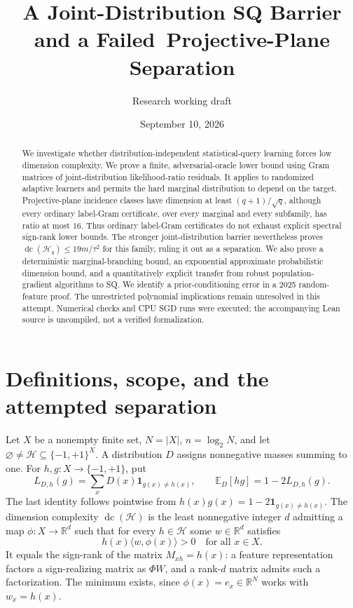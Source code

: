 \documentclass[11pt]{article}
\title{A Joint-Distribution SQ Barrier and a Failed\ Projective-Plane Separation}
\author{Research working draft}
\date{September 10, 2026}
\DeclareMathOperator{\dc}{dc}
\newcommand{\R}{\mathbb R}
\newcommand{\E}{\mathbb E}
\newcommand{\1}{\mathbf 1}
\newcommand{\cH}{\mathcal H}
\begin{document}
\maketitle
\begin{abstract}
We investigate whether distribution-independent statistical-query learning forces low dimension complexity. We prove a finite, adversarial-oracle lower bound using Gram matrices of joint-distribution likelihood-ratio residuals. It applies to randomized adaptive learners and permits the hard marginal distribution to depend on the target. Projective-plane incidence classes have dimension at least $(q+1)/\sqrt q$, although every ordinary label-Gram certificate, over every marginal and every subfamily, has ratio at most $16$. Thus ordinary label-Gram certificates do not exhaust explicit spectral sign-rank lower bounds. The stronger joint-distribution barrier nevertheless proves $\dc(\cH_q)\leq 19m/\tau^2$ for this family, ruling it out as a separation. We also prove a deterministic marginal-branching bound, an exponential approximate probabilistic dimension bound, and a quantitatively explicit transfer from robust population-gradient algorithms to SQ. We identify a prior-conditioning error in a 2025 random-feature proof. The unrestricted polynomial implications remain unresolved in this attempt. Numerical checks and CPU SGD runs were executed; the accompanying Lean source is uncompiled, not a verified formalization.
\end{abstract}

\section{Definitions, scope, and the attempted separation}
Let $X$ be a nonempty finite set, $N=|X|$, $n=\log_2N$, and let $\varnothing\ne\cH\subseteq\{-1,+1\}^X$. A distribution $D$ assigns nonnegative masses summing to one. For $h,g:X\to\{-1,+1\}$, put
\[
 L_{D,h}(g)=\sum_xD(x)\1_{g(x)\ne h(x)},\qquad
 \E_D[hg]=1-2L_{D,h}(g).
\]
The last identity follows pointwise from $h(x)g(x)=1-2\1_{g(x)\ne h(x)}$.
The dimension complexity $\dc(\cH)$ is the least nonnegative integer $d$ admitting a map $\phi:X\to\R^d$ such that for every $h\in\cH$ some $w\in\R^d$ satisfies
\begin{equation}\label{eq:strict}
 h(x)\langle w,\phi(x)\rangle>0\quad\text{for all }x\in X.
\end{equation}
It equals the sign-rank of the matrix $M_{xh}=h(x)$: a feature representation factors a sign-realizing matrix as $\Phi W$, and a rank-$d$ matrix admits such a factorization. The minimum exists, since $\phi(x)=e_x\in\R^N$ works with $w_x=h(x)$.
\end{document}
